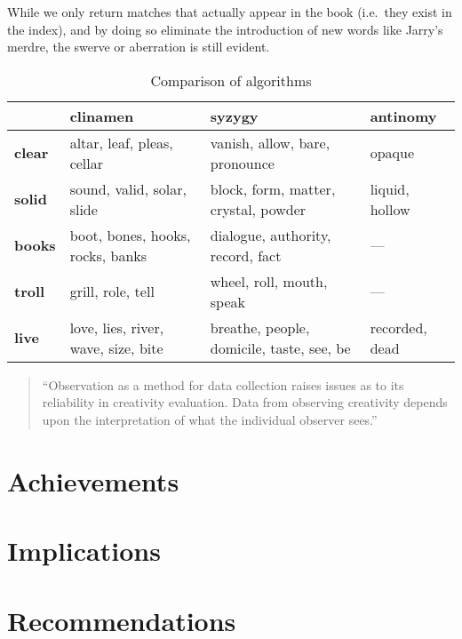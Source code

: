 While we only return matches that actually appear in the book (i.e.\ they exist in the index), and by doing so eliminate the introduction of new words like Jarry's merdre, the swerve or aberration is still evident.

\begin{table}[htb]
  \begin{tabu}{X[1,L]|X[3,L]X[3,L]X[2,L]}
  \toprule
  &
  \textbf{clinamen}
  &
  \textbf{syzygy}
  &
  \textbf{antinomy}
  \\ \midrule
  \textbf{clear}
  &
  altar, leaf, pleas, cellar
  &
  vanish, allow, bare, pronounce
  &
  opaque
  \\ \midrule
  \textbf{solid}
  &
  sound, valid, solar, slide
  &
  block, form, matter, crystal, powder
  &
  liquid, hollow
  \\ \midrule
  \textbf{books}
  &
  boot, bones, hooks, rocks, banks
  &
  dialogue, authority, record, fact
  &
  ---
  \\ \midrule
  \textbf{troll}
  &
  grill, role, tell
  &
  wheel, roll, mouth, speak
  &
  ---
  \\ \midrule
  \textbf{live}
  &
  love, lies, river, wave, size, bite
  &
  breathe, people, domicile, taste, see, be
  &
  recorded, dead
  \\ \bottomrule
  \end{tabu}
\caption[Comparison of algorithms]{Comparison of algorithms}
\label{algorithmscomp}
\end{table}

\begin{quote}
  ``Observation as a method for data collection raises issues as to its reliability in creativity evaluation. Data from observing creativity depends upon the interpretation of what the individual observer sees.'' \autocite[p.22]{Candy2012}
\end{quote}


\section{Achievements}

\section{Implications}

\section{Recommendations}

\stopcontents[chapters]
